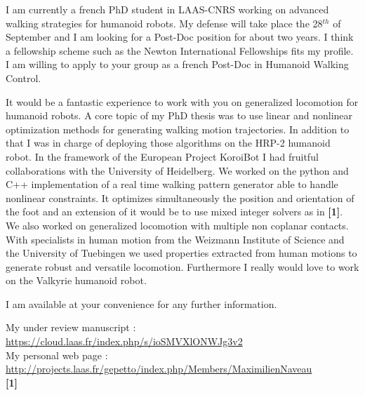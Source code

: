 \documentclass[10pt,stdletter,dateno,sigleft]{newlfm} %
\begin{document}
\begin{newlfm}


I am currently a french PhD student in LAAS-CNRS working on advanced walking strategies for humanoid robots.
My defense will take place the 28$^{th}$ of September and I am looking for a Post-Doc position for about two years.
I think a fellowship scheme such as the Newton International Fellowships fits my profile.
I am willing to apply to your group as a french Post-Doc in Humanoid Walking Control.

It would be a fantastic experience to work with you on generalized locomotion for humanoid robots.
A core topic of my PhD thesis was to use linear and nonlinear optimization methods for generating walking motion trajectories.
In addition to that I was in charge of deploying those algorithms on the HRP-2 humanoid robot.
In the framework of the European Project KoroiBot I had fruitful collaborations with the University of Heidelberg.
We worked on the python and C++ implementation of a real time walking pattern generator able to handle nonlinear constraints.
It optimizes simultaneously the position and orientation of the foot and an extension of it would be to use mixed integer solvers as in \textbf{[1]}.
We also worked on generalized locomotion with multiple non coplanar contacts.
With specialists in human motion from the Weizmann Institute of Science and the University of Tuebingen we used properties extracted from human motions to generate robust and versatile locomotion.
Furthermore I really would love to work on the Valkyrie humanoid robot.

I am available at your convenience for any further information.

My under review manuscript : \url{https://cloud.laas.fr/index.php/s/ioSMVXlONWJg3v2}\\
My personal web page : \url{http://projects.laas.fr/gepetto/index.php/Members/MaximilienNaveau}\\
\textbf{[1]} \\


\end{newlfm}
\end{document}
